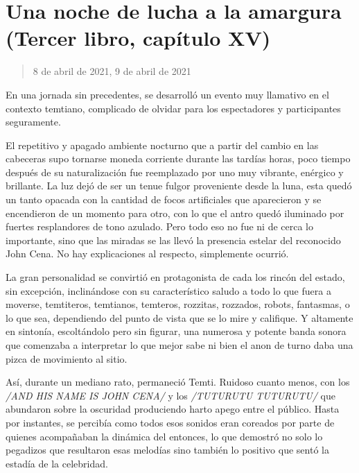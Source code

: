 \documentclass[
]{book}
\begin{document}
\hypertarget{una-noche-de-lucha-a-la-amargura-tercer-libro-capuxedtulo-xv}{%
\section{Una noche de lucha a la amargura (Tercer libro, capítulo XV)}\label{una-noche-de-lucha-a-la-amargura-tercer-libro-capuxedtulo-xv}}

\begin{quote}
8 de abril de 2021, 9 de abril de 2021
\end{quote}

En una jornada sin precedentes, se desarrolló un evento muy llamativo en el contexto temtiano, complicado de olvidar para los espectadores y participantes seguramente.

El repetitivo y apagado ambiente nocturno que a partir del cambio en las cabeceras supo tornarse moneda corriente durante las tardías horas, poco tiempo después de su naturalización fue reemplazado por uno muy vibrante, enérgico y brillante. La luz dejó de ser un tenue fulgor proveniente desde la luna, esta quedó un tanto opacada con la cantidad de focos artificiales que aparecieron y se encendieron de un momento para otro, con lo que el antro quedó iluminado por fuertes resplandores de tono azulado. Pero todo eso no fue ni de cerca lo importante, sino que las miradas se las llevó la presencia estelar del reconocido John Cena. No hay explicaciones al respecto, simplemente ocurrió.

La gran personalidad se convirtió en protagonista de cada los rincón del estado, sin excepción, inclinándose con su característico saludo a todo lo que fuera a moverse, temtiteros, temtianos, temteros, rozzitas, rozzados, robots, fantasmas, o lo que sea, dependiendo del punto de vista que se lo mire y califique. Y altamente en sintonía, escoltándolo pero sin figurar, una numerosa y potente banda sonora que comenzaba a interpretar lo que mejor sabe ni bien el anon de turno daba una pizca de movimiento al sitio.

Así, durante un mediano rato, permaneció Temti. Ruidoso cuanto menos, con los \emph{/AND HIS NAME IS JOHN CENA/} y los \emph{/TUTURUTU TUTURUTU/} que abundaron sobre la oscuridad produciendo harto apego entre el público. Hasta por instantes, se percibía como todos esos sonidos eran coreados por parte de quienes acompañaban la dinámica del entonces, lo que demostró no solo lo pegadizos que resultaron esas melodías sino también lo positivo que sentó la estadía de la celebridad.
\end{document}
